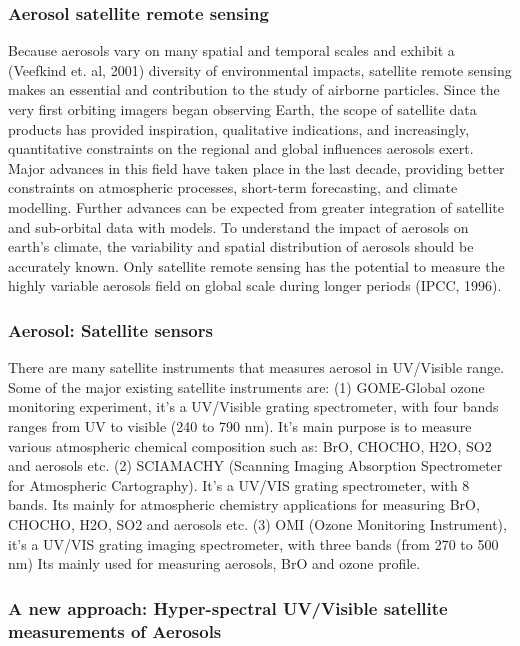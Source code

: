 \documentclass{scrartcl}
\begin{document}
\subsubsection{Aerosol satellite remote sensing}
Because aerosols vary on many spatial and temporal scales and exhibit a (Veefkind et. al, 2001) diversity of environmental impacts, satellite remote sensing makes an essential and contribution to the study of airborne particles. Since the very first orbiting imagers began observing Earth, the scope of satellite data products has provided inspiration, qualitative indications, and increasingly, quantitative constraints on the regional and global influences aerosols exert. Major advances in this field have taken place in the last decade, providing better constraints on atmospheric processes, short-term forecasting, and climate modelling. Further advances can be expected from greater integration of satellite and sub-orbital data with models. To understand the impact of aerosols on earth’s climate, the variability and spatial distribution of aerosols should be accurately known. Only satellite remote sensing has the potential to measure the highly variable aerosols field on global scale during longer periods (IPCC, 1996).

\subsubsection{Aerosol: Satellite sensors}
There are many satellite instruments that measures aerosol in UV/Visible range.  Some of the major existing satellite instruments are: (1) GOME-Global ozone monitoring experiment, it’s a UV/Visible grating spectrometer, with four bands ranges from UV to visible (240 to 790 nm). It’s main purpose is to measure various atmospheric chemical composition such as: BrO, CHOCHO, H2O, SO2 and aerosols etc. (2) SCIAMACHY (Scanning Imaging Absorption Spectrometer for Atmospheric Cartography). It’s a UV/VIS grating spectrometer, with 8 bands. Its mainly for atmospheric chemistry applications for measuring BrO, CHOCHO, H2O, SO2 and aerosols etc. (3) OMI (Ozone Monitoring Instrument), it’s a UV/VIS grating imaging spectrometer, with three bands (from 270 to 500 nm) Its mainly used for measuring aerosols, BrO and ozone profile.


\subsubsection{A new approach: Hyper-spectral UV/Visible satellite measurements of Aerosols} 
\end{document}
